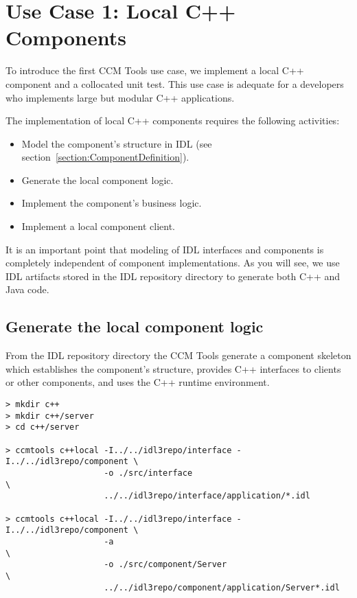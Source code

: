 \section{Use Case 1: Local C++ Components}
\label{section:LocalC++ComponentImplementation}

To introduce the first CCM Tools use case, we implement a local C++ component and a
collocated unit test. This use case is adequate for a developers who implements
large but modular C++ applications.

\vspace{3mm}
The implementation of local C++ components requires the following activities:
\begin{itemize}
	\item Model the component's structure in IDL 
			(see section~\ref{section:ComponentDefinition}). 
	\item Generate the local component logic.
	\item Implement the component's business logic.
	\item Implement a local component client.
\end{itemize}

It is an important point that modeling of IDL interfaces and components 
is completely independent of component implementations.
As you will see, we use IDL artifacts stored in the IDL repository directory
to generate both C++ and Java code.  
 
 
\subsection{Generate the local component logic}
\label{subsection:GenerateComponentLogic}

From the IDL repository directory the CCM Tools
generate a component skeleton which establishes the component's structure,
provides C++ interfaces to clients or other components, and uses the C++ runtime 
environment.
\begin{footnotesize}
\begin{verbatim}
> mkdir c++
> mkdir c++/server
> cd c++/server

> ccmtools c++local -I../../idl3repo/interface -I../../idl3repo/component \
                    -o ./src/interface                                    \
                    ../../idl3repo/interface/application/*.idl            

> ccmtools c++local -I../../idl3repo/interface -I../../idl3repo/component \
                    -a                                                    \
                    -o ./src/component/Server                             \
                    ../../idl3repo/component/application/Server*.idl
\end{verbatim}
\end{footnotesize}

